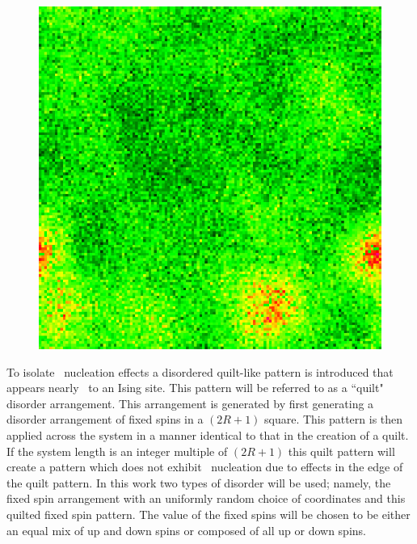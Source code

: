 \begin{figure}[!h]
  \centering
      \includegraphics[scale=0.35]{Figures/fix52/ER52.png}
  \label{fig:fixdensProb}
\end{figure}%
To isolate \het\ nucleation effects a disordered quilt-like pattern is introduced that appears nearly \homo\ to an Ising site. This pattern will be referred to as a ``quilt" disorder arrangement. This arrangement is generated by first generating a disorder arrangement of fixed spins in a $(2R+1)$ square. This pattern is then applied across the system in a manner identical to that in the creation of a quilt. If the system length is an integer multiple of $(2R+1)$ this quilt pattern will create a pattern which does not exhibit \het\ nucleation due to effects in the edge of the quilt pattern. In this work two types of disorder will be used; namely, the fixed spin arrangement with an uniformly random choice of coordinates and this quilted fixed spin pattern. The value of the fixed spins will be chosen to be either an equal mix of up and down spins or composed of all up or down spins. 

